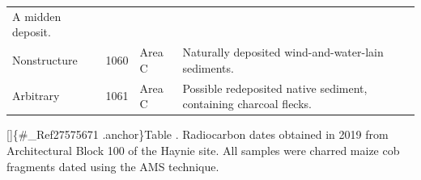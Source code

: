 \documentclass[
  12pt,
]{krantz}
\begin{document}
\begin{longtable}[]{@{}llll@{}}
\begin{minipage}[t]{0.38\columnwidth}
A midden deposit.\strut
\end{minipage}\tabularnewline
\begin{minipage}[t]{0.18\columnwidth}\raggedright
Nonstructure\strut
\end{minipage} & \begin{minipage}[t]{0.11\columnwidth}\raggedright
1060\strut
\end{minipage} & \begin{minipage}[t]{0.16\columnwidth}\raggedright
Area C\strut
\end{minipage} & \begin{minipage}[t]{0.38\columnwidth}\raggedright
Naturally deposited
wind-and-water-lain
sediments.\strut
\end{minipage}\tabularnewline
\begin{minipage}[t]{0.18\columnwidth}\raggedright
Arbitrary\strut
\end{minipage} & \begin{minipage}[t]{0.11\columnwidth}\raggedright
1061\strut
\end{minipage} & \begin{minipage}[t]{0.16\columnwidth}\raggedright
Area C\strut
\end{minipage} & \begin{minipage}[t]{0.38\columnwidth}\raggedright
Possible redeposited native
sediment, containing
charcoal flecks.\strut
\end{minipage}\tabularnewline
\bottomrule
\end{longtable}

{[}{]}\{\#\_Ref27575671 .anchor\}Table . Radiocarbon dates obtained in 2019 from
Architectural Block 100 of the Haynie site. All samples were charred
maize cob fragments dated using the AMS technique.
\end{document}
